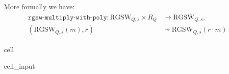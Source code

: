 \documentclass[letterpaper,10pt,english]{jupyterBook}
\begin{document}
\sphinxAtStartPar
More formally we have:
\begin{equation*}
\begin{split}\begin{split}
\texttt{rgsw-multiply-with-poly}: \mathrm{RGSW}_{Q,s} \times R_Q &\longrightarrow \mathrm{RGSW}_{Q,s}, \\
(\mathrm{RGSW}_{Q,s}(m), r) &\leadsto \mathrm{RGSW}_{Q,s}(r\cdot m)
\end{split}\end{split}
\end{equation*}
\begin{sphinxuseclass}{cell}\begin{sphinxVerbatimInput}

\begin{sphinxuseclass}{cell_input}
\begin{sphinxVerbatim}[commandchars=\\\{\}]
   
      \PYG{p}{[}\PYG{p}{]}
      \PYG{p}{[}\PYG{p}{[}\PYG{p}{[}\PYG{p}{]}    \PYG{p}{]}  \PYG{p}{[}\PYG{p}{[}\PYG{p}{]}    \PYG{p}{]}\PYG{p}{]}
       
           
                \PYG{p}{[}\PYG{p}{]}\PYG{p}{[}\PYG{p}{]}  \PYG{p}{[}\PYG{p}{]}\PYG{p}{[}\PYG{p}{]}  
     
\end{sphinxVerbatim}

\end{sphinxuseclass}\end{sphinxVerbatimInput}

\end{sphinxuseclass}
\begin{DUlineblock}{0em}
\item[] 
\end{DUlineblock}
\end{document}

